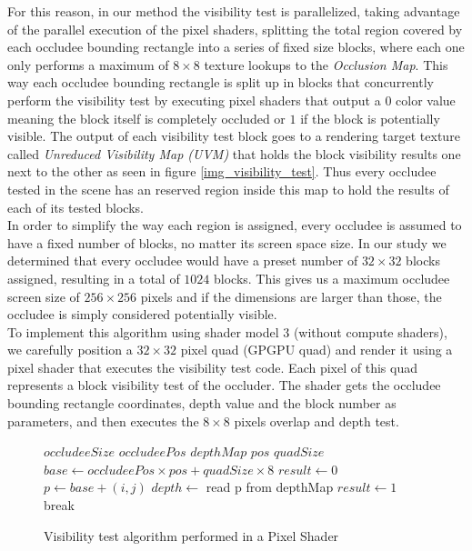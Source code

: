 \documentclass[10pt, conference]{IEEEtran}
\begin{document}
For this reason, in our method the visibility test is parallelized, taking advantage of the parallel execution of the pixel shaders, 
splitting the total region covered by each occludee bounding rectangle into a series of fixed size blocks, where each one only performs 
a maximum of $8 \times 8$ texture lookups to the \emph{Occlusion Map}. 
This way each occludee bounding rectangle is split up in  blocks that concurrently perform the visibility test by executing pixel shaders that 
output a $0$ color value meaning the block itself is completely occluded or $1$ if the block is potentially visible. 
The output of each visibility test block goes to a rendering target texture called \emph{Unreduced Visibility Map (UVM)} that holds 
the block visibility results one next to the other as seen in figure \ref{img_visibility_test}. 
Thus every occludee tested in the scene has an reserved region inside this map to hold the results of each of its tested blocks.\\

In order to simplify the way each region is assigned, every occludee is assumed to have a fixed number of blocks, no matter its screen space size. 
In our study we determined that every occludee would have a preset number of $32 \times 32$ blocks assigned, resulting in a total of $1024$ blocks. 
This gives us a maximum occludee screen size of $256 \times 256$ pixels and if the dimensions are larger than those, the occludee is simply considered potentially visible.\\

To implement this algorithm using shader model 3 (without compute shaders), we carefully position a $32 \times 32$ pixel quad (GPGPU quad) and render it using a pixel 
shader that executes the visibility test code. 
Each pixel of this quad represents a block visibility test of the occluder. 
The shader gets the occludee bounding rectangle coordinates, depth value and the block number as parameters, and then executes the $8 \times 8$ pixels 
overlap and depth test.\\

\begin{figure}[!hbp]
	\begin{algorithmic}[1]
		\REQUIRE $occludeeSize$
		\REQUIRE $occludeePos$ 
		\REQUIRE $depthMap$
		\REQUIRE $pos$ 
		\REQUIRE $quadSize$
		\STATE $base \leftarrow occludeePos \times pos + quadSize \times 8$
		\STATE $result \leftarrow 0$ 
				\STATE $p \leftarrow base + (i, j)$
				\STATE $depth \leftarrow$ read p from depthMap
					\STATE $result \leftarrow 1$ 
					\STATE break
				\ENDIF
			\ENDFOR
		\ENDFOR
	\end{algorithmic}
	\caption{Visibility test algorithm performed in a Pixel Shader}
\end{figure}
\end{document}
